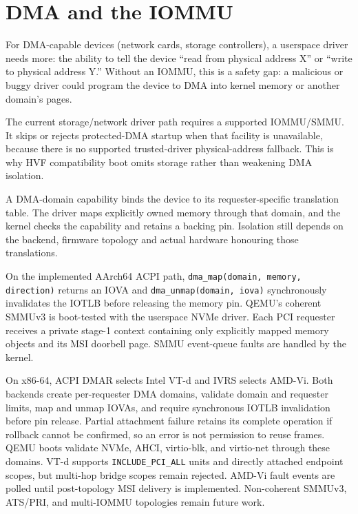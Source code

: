\section{DMA and the IOMMU}

For DMA-capable devices (network cards, storage controllers), a userspace
driver needs more: the ability to tell the device ``read from physical address
X'' or ``write to physical address Y.'' Without an IOMMU, this is a safety
gap: a malicious or buggy driver could program the device to DMA into kernel
memory or another domain's pages.

The current storage/network driver path requires a supported IOMMU/SMMU.
It skips or rejects protected-DMA startup when that facility is unavailable, because
there is no supported trusted-driver physical-address fallback. This is why
HVF compatibility boot omits storage rather than weakening DMA isolation.

A DMA-domain capability binds the device to its requester-specific translation
table. The driver maps explicitly owned memory through that domain, and the kernel
checks the capability and retains a backing pin. Isolation still depends on the
backend, firmware topology and actual hardware honouring those translations.

On the implemented AArch64 ACPI path, \texttt{dma\_map(domain, memory,
direction)} returns an IOVA and \texttt{dma\_unmap(domain, iova)}
synchronously invalidates the IOTLB before releasing the memory pin. QEMU's
coherent SMMUv3 is boot-tested with the userspace NVMe driver. Each PCI
requester receives a private stage-1 context containing only explicitly mapped
memory objects and its MSI doorbell page. SMMU event-queue faults are handled
by the kernel.

On x86-64, ACPI DMAR selects Intel VT-d and IVRS selects AMD-Vi. Both backends
create per-requester DMA domains, validate domain and requester limits, map and
unmap IOVAs, and require synchronous IOTLB invalidation before pin release.
Partial attachment failure retains its complete operation if rollback cannot
be confirmed, so an error is not permission to reuse frames. QEMU boots validate NVMe,
AHCI, virtio-blk, and virtio-net through these domains. VT-d supports
\texttt{INCLUDE\_PCI\_ALL} units and directly attached endpoint scopes, but
multi-hop bridge scopes remain rejected. AMD-Vi fault events are polled until
post-topology MSI delivery is implemented. Non-coherent SMMUv3, ATS/PRI, and
multi-IOMMU topologies remain future work.

